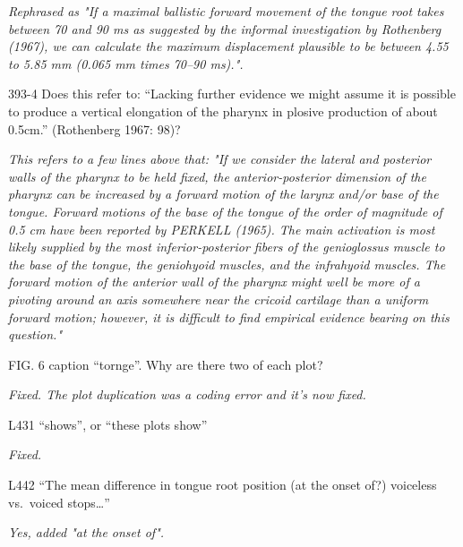 \documentclass[]{article}
\begin{document}
\begin{adjustwidth}{1cm}{} \textit{
Rephrased as "If a maximal ballistic forward movement of the tongue root takes between 70 and 90 ms as suggested by the informal investigation by Rothenberg (1967), we can calculate the maximum displacement plausible to be between 4.55 to 5.85 mm (0.065 mm times 70–90 ms).".
} \end{adjustwidth}

393-4 Does this refer to: ``Lacking further evidence we might assume it
is possible to produce a vertical elongation of the pharynx in plosive
production of about 0.5cm.'' (Rothenberg 1967: 98)?

\begin{adjustwidth}{1cm}{} \textit{
This refers to a few lines above that: "If we consider the lateral and posterior walls of the pharynx to be held fixed, the anterior-posterior dimension of the pharynx can be increased by a forward motion of the larynx and/or base of the tongue. Forward motions of the base of the tongue of the order of magnitude of 0.5 cm have been reported by PERKELL (1965). The main activation is most likely supplied by the most inferior-posterior fibers of the genioglossus muscle to the base of the tongue, the geniohyoid muscles, and the infrahyoid muscles. The forward motion of the anterior wall of the pharynx might well be more of a pivoting around an axis somewhere near the cricoid cartilage than a uniform forward motion; however, it is difficult to find empirical evidence bearing on this question."
} \end{adjustwidth}

FIG. 6 caption ``tornge''. Why are there two of each plot?

\begin{adjustwidth}{1cm}{} \textit{
Fixed. The plot duplication was a coding error and it's now fixed.
} \end{adjustwidth}

L431 ``shows'', or ``these plots show''

\begin{adjustwidth}{1cm}{} \textit{
Fixed.
} \end{adjustwidth}

L442 ``The mean difference in tongue root position (at the onset of?)
voiceless vs.~voiced stops\ldots{}''

\begin{adjustwidth}{1cm}{} \textit{
Yes, added "at the onset of".
} \end{adjustwidth}
\end{document}
